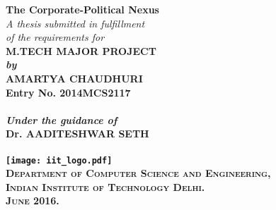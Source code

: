 \begin{titlepage}
\begin{center}

\LARGE{\textsf{\bfseries The Corporate-Political Nexus}}\\
\vspace{20pt}
\normalsize
\emph{A thesis submitted in fulfillment} \\
\emph{of the requirements for} \\
\vspace{20pt}
\bfseries M.TECH MAJOR PROJECT \\
\emph {by}\\
\vspace{20pt}
\Large{\textsf{\bfseries AMARTYA CHAUDHURI}} \\
{\normalsize \textsf{\bfseries Entry No. 2014MCS2117}}\\

\ \\
{\normalsize \emph {Under the guidance of}}
\ \\
\Large{\textsf{\bfseries Dr. AADITESHWAR SETH}} \\
\ \\
\vspace{30pt}
\texttt{[image: iit\_logo.pdf]} \\
\vspace{10pt}
\large{\textsc{Department of Computer Science and Engineering,\\
Indian Institute of Technology Delhi.\\ June 2016.}}
\end{center}
\end{titlepage}
